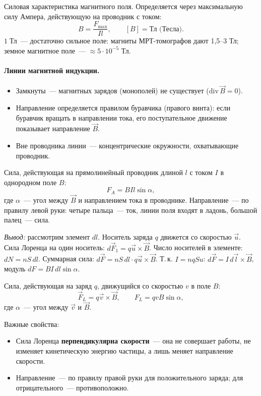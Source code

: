 \documentclass[12pt]{article}
\begin{document}
\begin{definition}
    Силовая характеристика магнитного поля. Определяется через максимальную
    силу Ампера, действующую на проводник с током:
    \[
        B = \frac{F_{\max}}{Il}, \qquad [B] = \text{Тл (Тесла)}.
    \]
    $1\;\text{Тл}$~--- достаточно сильное поле: магниты МРТ-томографов дают
    1,5--3 Тл; земное магнитное поле~--- $\approx 5\cdot10^{-5}$ Тл.
\end{definition}

\paragraph{Линии магнитной индукции.}
\begin{itemize}
    \item Замкнуты~--- магнитных зарядов (монополей) не существует
          ($\mathrm{div}\,\vec{B} = 0$).
    \item Направление определяется правилом буравчика (правого винта): если
          буравчик вращать в направлении тока, его поступательное движение
          показывает направление $\vec{B}$.
    \item Вне проводника линии~--- концентрические окружности, охватывающие
          проводник.
\end{itemize}

\begin{definition}
    Сила, действующая на прямолинейный проводник длиной $l$ с током $I$ в
    однородном поле $B$:
    \[
        F_A = BIl\sin\alpha,
    \]
    где $\alpha$~--- угол между $\vec{B}$ и направлением тока в проводнике.
    Направление~--- по правилу левой руки: четыре пальца~--- ток, линии поля
    входят в ладонь, большой палец~--- сила.

    \textit{Вывод:} рассмотрим элемент $dl$. Носитель заряда $q$ движется со
    скоростью $\vec{u}$. Сила Лоренца на один носитель: $d\vec{F}_1 = q\vec{u}
    \times \vec{B}$. Число носителей в элементе: $dN = nS\,dl$. Суммарная сила:
    $d\vec{F} = nS\,dl \cdot q\vec{u}\times\vec{B}$. Т.\,к. $I = nqSu$:
    $d\vec{F} = I\,d\vec{l}\times\vec{B}$, модуль $dF = BI\,dl\sin\alpha$.
\end{definition}

\begin{definition}
    Сила, действующая на заряд $q$, движущийся со скоростью $v$ в поле $B$:
    \[
        \vec{F}_L = q\vec{v}\times\vec{B}, \qquad F_L = qvB\sin\alpha,
    \]
    где $\alpha$~--- угол между $\vec{v}$ и $\vec{B}$.

    Важные свойства:
    \begin{itemize}
        \item Сила Лоренца \textbf{перпендикулярна скорости}~--- она не
              совершает работы, не изменяет кинетическую энергию частицы, а
              лишь меняет направление скорости.
        \item Направление~--- по правилу правой руки для положительного заряда;
              для отрицательного~--- противоположно.
    \end{itemize}
\end{definition}
\end{document}
